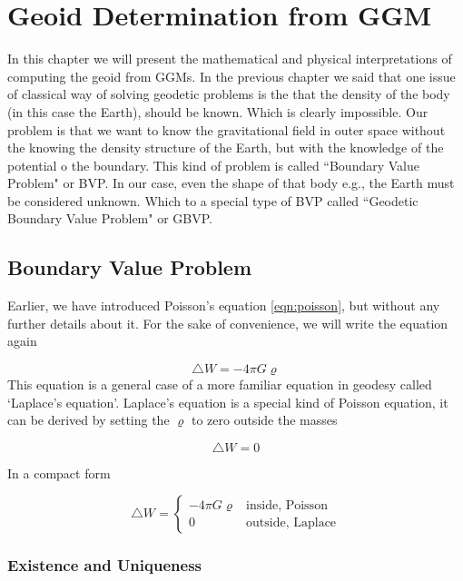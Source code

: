 \chapter{Geoid Determination from GGM}

In this chapter we will present the mathematical and physical interpretations of computing the geoid from GGMs. In the previous chapter we said that one issue of classical way of solving geodetic problems is the that the density of the body (in this case the Earth), should be known. Which is clearly impossible. Our problem is that we want to know the gravitational field in outer space without the knowing the density structure of the Earth, but with the knowledge of the potential o the boundary. This kind of problem is called ``Boundary Value Problem" or BVP. In our case, even the shape of that body e.g., the Earth must be considered unknown. Which to a special type of BVP called ``Geodetic Boundary Value Problem" or GBVP.

\section{Boundary Value Problem}

Earlier, we have introduced Poisson's equation \ref{eqn:poisson}, but without any further details about it. For the sake of convenience, we will write the equation again

\begin{equation}
\triangle W = -4 \pi G \varrho
\end{equation} 
This equation is a general case of a more familiar equation in geodesy called `Laplace's equation'. Laplace's equation is a special kind of Poisson equation, it can be derived by setting the $\varrho$ to zero outside the masses

\begin{equation}
\label{eqn:laplace}
\triangle W = 0
\end{equation}

In a compact form 

\begin{equation}
\triangle W = 
\begin{cases}
-4 \pi G \varrho & \text{inside, Poisson} \\
0 & \text{outside, Laplace}
\end{cases}
\end{equation}




\subsection{Existence and Uniqueness}

